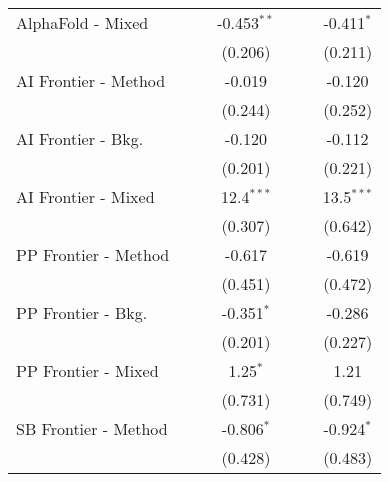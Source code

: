 \begin{tabular}{lcccccc}
   AlphaFold - Mixed    &                &               & -0.453$^{**}$  &                &               & -0.411$^{*}$\\   
                        &                &               & (0.206)        &                &               & (0.211)\\   
   AI Frontier - Method &                &               & -0.019         &                &               & -0.120\\   
                        &                &               & (0.244)        &                &               & (0.252)\\   
   AI Frontier - Bkg.   &                &               & -0.120         &                &               & -0.112\\   
                        &                &               & (0.201)        &                &               & (0.221)\\   
   AI Frontier - Mixed  &                &               & 12.4$^{***}$   &                &               & 13.5$^{***}$\\   
                        &                &               & (0.307)        &                &               & (0.642)\\   
   PP Frontier - Method &                &               & -0.617         &                &               & -0.619\\   
                        &                &               & (0.451)        &                &               & (0.472)\\   
   PP Frontier - Bkg.   &                &               & -0.351$^{*}$   &                &               & -0.286\\   
                        &                &               & (0.201)        &                &               & (0.227)\\   
   PP Frontier - Mixed  &                &               & 1.25$^{*}$     &                &               & 1.21\\   
                        &                &               & (0.731)        &                &               & (0.749)\\   
   SB Frontier - Method &                &               & -0.806$^{*}$   &                &               & -0.924$^{*}$\\   
                        &                &               & (0.428)        &                &               & (0.483)\\   

\end{tabular}

